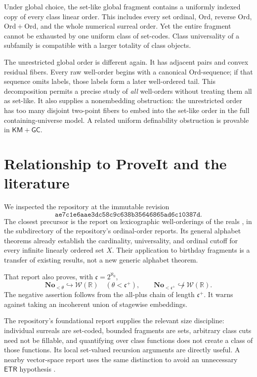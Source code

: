 \documentclass[11pt]{article}
\theoremstyle{definition}
\theoremstyle{remark}
\newcommand{\No}{\mathbf{No}}
\newcommand{\Ord}{\mathrm{Ord}}
\newcommand{\WO}{\mathcal W}
\newcommand{\emb}{\hookrightarrow}
\newcommand{\KM}{\mathsf{KM}}
\newcommand{\ETR}{\mathsf{ETR}}
\newcommand{\GC}{\mathsf{GC}}
\begin{document}
Under global choice, the set-like global fragment contains a uniformly
indexed copy of every class linear order. This includes every set ordinal,
\(\Ord\), reverse \(\Ord\), \(\Ord+\Ord\), and the whole numerical
surreal order. Yet the entire fragment cannot be exhausted by one uniform
class of set-codes. Class universality of a subfamily is compatible with
a larger totality of class objects.

The unrestricted global order is different again. It has adjacent pairs
and convex residual fibers. Every raw well-order begins with a canonical
\(\Ord\)-sequence; if that sequence omits labels, those labels form a
later well-ordered tail. This decomposition permits a precise study of
\emph{all} well-orders without treating them all as set-like.
It also supplies a nonembedding obstruction: the unrestricted order has
too many disjoint two-point fibers to embed into the set-like order in
the full containing-universe model. A related uniform definability
obstruction is provable in \(\KM+\GC\).


\section{Relationship to ProveIt and the literature}\label{swo:sec:sources}

We inspected the repository at the immutable revision
\[
 \texttt{ae7c1e6aae3dc58c9c638b35646865ad6c10387d}.
\]
The closest precursor is the report on lexicographic well-orderings of
the reals \cite{ProveItReals}, in the subdirectory
of the repository's ordinal-order reports.
Its general alphabet theorems already establish the cardinality,
universality, and ordinal cutoff for every infinite linearly ordered
set \(X\). Their application to birthday fragments is a transfer of
existing results, not a new generic alphabet theorem.

That report also proves, with \(\mathfrak c=2^{\aleph_0}\),
\[
 \No_{<\theta}\emb\WO(\mathbb R)\quad(\theta<\mathfrak c^+),
 \qquad
 \No_{<\mathfrak c^+}\not\emb\WO(\mathbb R).
\]
The negative assertion follows from the all-plus chain of length
\(\mathfrak c^+\). It warns against taking an incoherent union of
stagewise embeddings.

The repository's foundational report \cite{ProveItFoundations} supplies
the relevant size discipline: individual surreals are set-coded, bounded
fragments are sets, arbitrary class cuts need not be fillable, and
quantifying over class functions does not create a class of those
functions. Its local set-valued recursion arguments are directly useful.
A nearby vector-space report uses the same distinction to avoid an
unnecessary \(\ETR\) hypothesis \cite{ProveItVector}.
\end{document}

